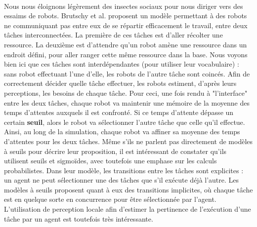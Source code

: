         \paragraph{}
		Nous nous éloignons légèrement des insectes sociaux pour nous diriger vers des essaims de robots. Brutschy et al. \cite{brutschy_self-organized_2014} proposent un modèle permettant à des robots ne communiquant pas entre eux de se répartir efficacement le travail, entre deux tâches interconnectées. La première de ces tâches est d'aller récolter une ressource. La deuxième est d'attendre qu'un robot amène une ressource dans un endroit défini, pour aller ranger cette même ressource dans la base. Nous voyons bien ici que ces tâches sont interdépendantes (pour utiliser leur vocabulaire) : sans robot effectuant l'une d'elle, les robots de l'autre tâche sont coincés. Afin de correctement décider quelle tâche effectuer, les robots estiment, d'après leurs perceptions, les besoins de chaque tâche. Pour ceci, une fois rendu à "l'interface" entre les deux tâches, chaque robot va maintenir une mémoire de la moyenne des temps d'attentes auxquels il est confronté. Si ce temps d'attente dépasse un certain \textbf{seuil}, alors le robot va sélectionner l'autre tâche que celle qu'il effectue. Ainsi, au long de la simulation, chaque robot va affiner sa moyenne des temps d'attentes pour les deux tâches. Même s'ils ne parlent pas directement de modèles à seuils pour décrire leur proposition, il est intéressant de constater qu'ils utilisent seuils et sigmoïdes, avec toutefois une emphase sur les calculs probabilistes. Dans leur modèle, les transitions entre les tâches sont explicites : un agent ne peut sélectionner une des tâches que s'il exécute déjà l'autre. Les modèles à seuils proposent quant à eux des transitions implicites, où chaque tâche est en quelque sorte en concurrence pour être sélectionnée par l'agent. L'utilisation de perception locale afin d'estimer la pertinence de l'exécution d'une tâche par un agent est toutefois très intéressante.
        
